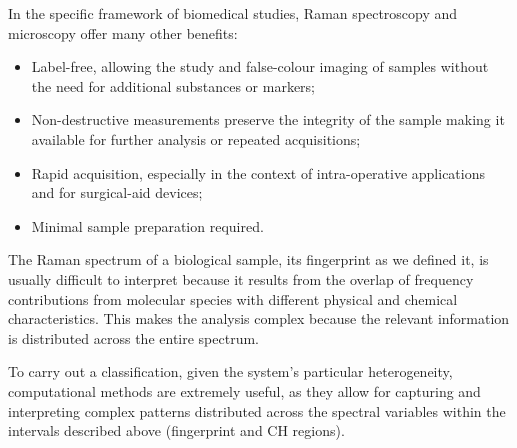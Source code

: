 In the specific framework of biomedical studies, Raman spectroscopy and microscopy offer many other benefits:
\begin{itemize}
    \item Label-free, allowing the study and false-colour imaging of samples without the need
              for additional substances or markers;

    \item Non-destructive measurements preserve the integrity of the sample
    making it available for further analysis or repeated acquisitions;
    
    \item  Rapid acquisition, especially in the context of intra-operative applications and for
surgical-aid devices;

     \item Minimal sample preparation required.
    \end{itemize}
    
    
The Raman spectrum of a biological sample, its fingerprint as we defined it, is usually difficult to interpret because it results from the overlap of frequency contributions from molecular species with different physical and chemical characteristics. This makes the analysis complex because the relevant information is distributed across the entire spectrum. 

To carry out a classification, given the system's particular heterogeneity, computational methods are extremely useful, as they allow for capturing and interpreting complex patterns distributed across the spectral variables within the intervals described above (fingerprint and CH regions).

   
